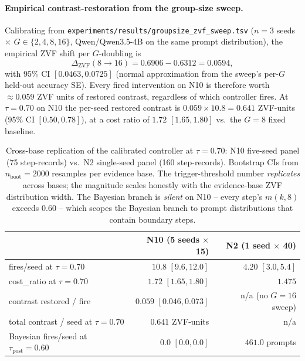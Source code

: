\paragraph{Empirical contrast-restoration from the group-size sweep.}
Calibrating from
\texttt{experiments/results/groupsize\_zvf\_sweep.tsv}
($n{=}3$ seeds $\times$ $G \in \{2, 4, 8, 16\}$, Qwen/Qwen3.5-4B
on the same prompt distribution), the empirical ZVF shift per
$G$-doubling is
\[
\Delta_{\mathrm{ZVF}}(8 \to 16) = 0.6906 - 0.6312 = 0.0594,
\]
with 95\% CI $[0.0463, 0.0725]$ (normal approximation from the
sweep's per-$G$ held-out accuracy SE). Every fired intervention
on N10 is therefore worth $\approx 0.059$ ZVF units of restored
contrast, regardless of which controller fires. At $\tau{=}0.70$
on N10 the per-seed restored contrast is
$0.059 \times 10.8 = 0.641$ ZVF-units (95\% CI $[0.50, 0.78]$),
at a cost ratio of $1.72$ $[1.65, 1.80]$ vs.\ the $G{=}8$
fixed baseline.

\begin{table}[t]
\centering
\caption{Cross-base replication of the calibrated controller at
$\tau{=}0.70$: N10 five-seed panel (75 step-records) vs.\ N2
single-seed panel (160 step-records). Bootstrap CIs from $n_{\text{boot}}{=}2000$
resamples per evidence base. The trigger-threshold number
\emph{replicates} across bases; the magnitude scales honestly with
the evidence-base ZVF distribution width. The Bayesian branch is
\emph{silent} on N10 -- every step's $m(k, 8)$ exceeds $0.60$ --
which scopes the Bayesian branch to prompt distributions that
contain boundary steps.}
\label{tab:p7-cross-base}
\begin{tabular}{lrr}
\toprule
 & \textbf{N10 (5 seeds $\times$ 15)} & \textbf{N2 (1 seed $\times$ 40)} \\
\midrule
fires/seed at $\tau{=}0.70$         & $10.8$ $[9.6, 12.0]$   & $4.20$ $[3.0, 5.4]$  \\
cost\_ratio at $\tau{=}0.70$        & $1.72$ $[1.65, 1.80]$  & $1.475$               \\
contrast restored / fire            & $0.059$ $[0.046, 0.073]$ & n/a (no $G{=}16$ sweep) \\
total contrast / seed at $\tau{=}0.70$ & $0.641$ ZVF-units     & n/a                   \\
Bayesian fires/seed at $\tau_{\text{post}}{=}0.60$ & $0.0$ $[0.0, 0.0]$ & $461.0$ prompts \\
\bottomrule
\end{tabular}
\end{table}

